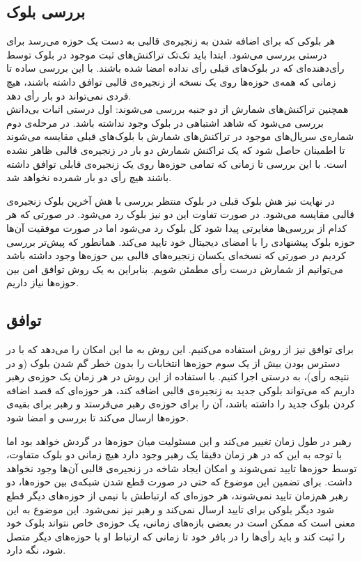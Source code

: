 \subsection{بررسی بلوک}
هر بلوکی که برای اضافه شدن به زنجیره‌ی قالبی به دست یک حوزه می‌رسد برای درستی بررسی می‌شود. ابتدا باید تک‌‌تک تراکنش‌های ثبت موجود در بلوک توسط رأی‌دهنده‌‌ای که در بلوک‌های قبلی رأی‌ نداده امضا شده باشند. با این بررسی ساده تا زمانی که همه‌ی حوزه‌ها روی یک نسخه از زنجیره‌ی قالبی توافق داشته باشند، هیچ فردی نمی‌تواند دو بار رأی ‌دهد.
\\
همچنین تراکنش‌های شمارش از دو جنبه بررسی می‌شوند: اول درستی اثبات‌ بی‌دانش بررسی می‌شود که شاهد اشتباهی در بلوک وجود نداشته باشد. در مرحله‌ی دوم شماره‌ی سریال‌های موجود در تراکنش‌های شمارش با بلوک‌های قبلی مقایسه می‌شوند تا اطمینان حاصل شود که یک تراکنش شمارش دو بار در زنجیره‌ی قالبی ظاهر نشده است. با این بررسی تا زمانی که تمامی حوزه‌ها روی یک زنجیره‌ی قابلی توافق داشته ‌باشند هیچ رأی دو بار شمرده نخواهد شد.
\par
در نهایت نیز هش بلوک قبلی در بلوک منتظر بررسی با هش آخرین بلوک زنجیره‌ی قالبی مقایسه می‌شود. در صورت تفاوت این دو نیز بلوک رد می‌شود. در صورتی که هر کدام از بررسی‌ها مغایرتی پیدا شود کل بلوک رد می‌شود اما در صورت موفقیت آن‌ها حوزه بلوک پیشنهادی را با امضای دیجیتال خود تایید می‌کند. همانطور که پیش‌تر بررسی کردیم در صورتی که نسخه‌ای یکسان زنجیره‌های قالبی بین حوزه‌ها وجود داشته باشد می‌توانیم از شمارش درست رأی مطمئن شویم. بنابراین به یک روش توافق امن بین حوزه‌ها نیاز داریم.


\subsection{توافق}
برای توافق نیز از روش  استفاده می‌کنیم. این روش به ما این امکان را می‌دهد که با در دسترس بودن بیش از یک سوم حوزه‌ها انتخابات را بدون خطر گم شدن بلوک (و در نتیجه رأی)، به درستی اجرا کنیم. با استفاده از این روش در هر زمان یک حوزه‌ی رهبر داریم که می‌تواند بلوکی جدید به زنجیره‌ی قالبی اضافه کند، هر حوزه‌ای که قصد اضافه کردن بلوک جدید را داشته باشد، آن را برای حوزه‌ی رهبر می‌فرستد و رهبر برای بقیه‌ی حوزه‌ها ارسال می‌کند تا بررسی و امضا شود. 

\par 
رهبر در طول زمان تغییر می‌کند و این مسئولیت میان حوزه‌ها در گردش خواهد بود اما با توجه  به این که در هر زمان دقیقا یک رهبر وجود دارد هیچ زمانی دو بلوک متفاوت، توسط حوزه‌ها تایید نمی‌شوند و امکان ایجاد شاخه در زنجیره‌ی قالبی آن‌ها وجود نخواهد داشت. برای تضمین این موضوع که حتی در صورت قطع شدن شبکه‌ی بین حوزه‌ها، دو رهبر هم‌زمان تایید نمی‌شوند، هر حوزه‌ای که ارتباطش با نیمی از حوزه‌های دیگر قطع شود دیگر بلوکی برای تایید ارسال نمی‌کند و رهبر نیز نمی‌شود. این موضوع به این معنی است که ممکن است در بعضی بازه‌های زمانی، یک حوزه‌ی خاص نتواند بلوک خود را ثبت کند و باید رأی‌ها را در بافر خود تا زمانی که ارتباط او با حوزه‌های دیگر متصل شود، نگه‌ دارد.

